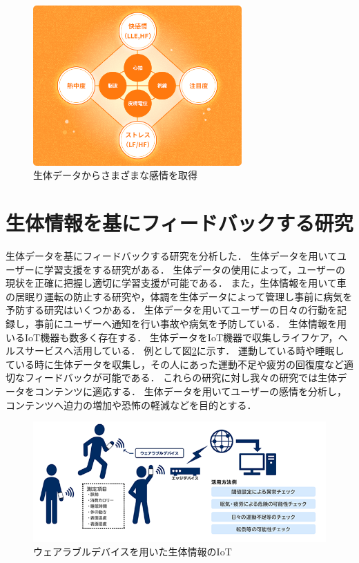 \begin{figure}[H]
    \centering
    \includegraphics[width=8cm]{images/chapter2/heart.png}
    \caption{生体データからさまざまな感情を取得\cite{kanjoutaiken}}
    \label{seitaidata}
\end{figure}


\section{生体情報を基にフィードバックする研究}

生体データを基にフィードバックする研究を分析した．
生体データを用いてユーザーに学習支援をする研究がある\cite{seitai1,seitai2,seitai3}．
生体データの使用によって，ユーザーの現状を正確に把握し適切に学習支援が可能である．
また，生体情報を用いて車の居眠り運転の防止する研究\cite{unten}や，体調を生体データによって管理し事前に病気を予防する研究\cite{kibun,yobou,yobou2}はいくつかある．
生体データを用いてユーザーの日々の行動を記録し，事前にユーザーへ通知を行い事故や病気を予防している．
生体情報を用いるIoT機器も数多く存在する．
生体データをIoT機器で収集しライフケア，ヘルスサービスへ活用している．
例として図\ref{iot}に示す．
運動している時や睡眠している時に生体データを収集し，その人にあった運動不足や疲労の回復度など適切なフィードバックが可能である．
これらの研究に対し我々の研究では生体データをコンテンツに適応する．
生体データを用いてユーザーの感情を分析し，コンテンツへ迫力の増加や恐怖の軽減などを目的とする．


\begin{figure}[H]
    \centering
    \includegraphics[width=15cm]{images/chapter2/body_img02.png}
    \caption{ウェアラブルデバイスを用いた生体情報のIoT\cite{nec}}
    \label{iot}
\end{figure}


